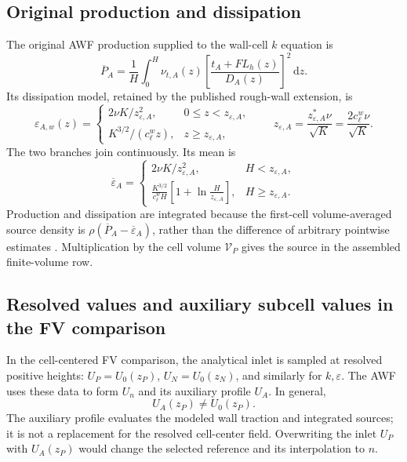 \documentclass[11pt,a4paper]{article}
\numberwithin{equation}{section}
\newcommand{\dd}{\mathrm{d}}
\newcommand{\eps}{\varepsilon}
\newcommand{\avg}[1]{\overline{#1}}
\newcommand{\EAw}{\eps_{A,w}}
\begin{document}
\subsection{Original production and dissipation}
The original AWF production supplied to the wall-cell $k$ equation is
\begin{equation}
 \boxed{\avg P_A=
 \frac1H\int_0^H\nu_{t,A}(z)
 \left[\frac{t_A+FL_h(z)}{D_A(z)}\right]^2\,\dd z.}
 \label{eq:PA}
\end{equation}
Its dissipation model, retained by the published rough-wall extension, is
\begin{equation}
\EAw(z)=
\begin{cases}
2\nu K/z_{\eps,A}^2,&0\leq z<z_{\eps,A},\\
K^{3/2}/(c_\ell^w z),&z\geq z_{\eps,A},
\end{cases}
\qquad z_{\eps,A}=\frac{z_{\eps,A}^*\nu}{\sqrt K}
 =\frac{2c_\ell^w\nu}{\sqrt K}.
\label{eq:epsA}
\end{equation}
The two branches join continuously. Its mean is
\begin{equation}
\avg\eps_A=
\begin{cases}
2\nu K/z_{\eps,A}^2,&H<z_{\eps,A},\\[1mm]
\displaystyle\frac{K^{3/2}}{c_\ell^w H}
 \left[1+\ln\frac{H}{z_{\eps,A}}\right],&H\geq z_{\eps,A}.
\end{cases}
\label{eq:epsAmean}
\end{equation}
Production and dissipation are integrated because the first-cell
volume-averaged source density is $\rho(\avg P_A-\avg\eps_A)$,
rather than the difference of arbitrary pointwise estimates
\cite[Eqs.~(4), (19)--(21)]{SCI2006}. Multiplication by the cell volume
$\mathcal V_P$ gives the source in the assembled finite-volume row.

\subsection{Resolved values and auxiliary subcell values in the FV comparison}
\label{sec:noslip}
In the cell-centered FV comparison, the analytical inlet is sampled at resolved positive heights:
$U_P=U_0(z_P)$, $U_N=U_0(z_N)$, and similarly for $k,\eps$.
The AWF uses these data to form $U_n$ and its auxiliary profile $U_A$.
In general,
\begin{equation}
 U_A(z_P)\ne U_0(z_P).
 \label{eq:twovelocities}
\end{equation}
The auxiliary profile evaluates the modeled wall traction and integrated
sources; it is not a replacement for the resolved cell-center field.
Overwriting the inlet $U_P$ with $U_A(z_P)$ would change the selected
reference and its interpolation to $n$.
\end{document}
